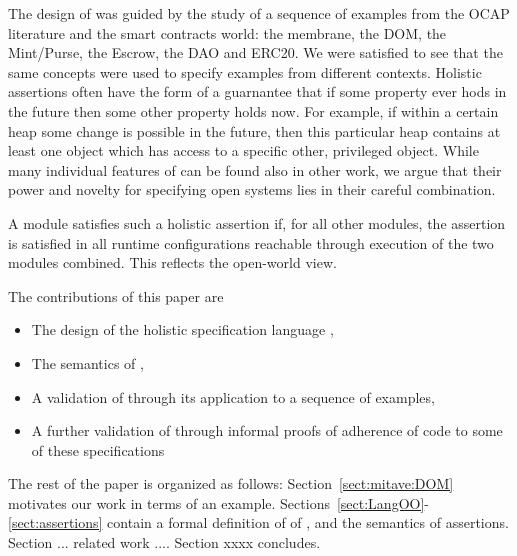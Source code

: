The design of \Chainmail was guided by the study of a sequence of examples from the OCAP literature and the 
smart contracts world: the membrane, the DOM, the Mint/Purse, the Escrow, the DAO and ERC20. 
We were satisfied to see that the same concepts were used to specify examples from  different contexts.
Holistic assertions often have the form of a guarnantee
 that if some property ever hods in the future then some other property holds now.
For example, if within a certain heap some change is possible in the future, then this particular heap contains 
at least one object which has access to a specific other, privileged object.
%
While many individual features of \Chainmail can be found also in other work, 
we argue that their power and novelty for specifying open systems lies in their careful combination.
 
A module satisfies such a holistic assertion if, for all other modules,
  the assertion is satisfied  in all runtime configurations reachable through execution of the two modules combined.
  This reflects the open-world view.
  
The contributions of this paper are
\begin{itemize}
\item The design of the holistic specification language \Chainmail,
\item The semantics of \Chainmail,
\item A validation of \Chainmail through its application to a sequence of examples,
\item A further validation of \Chainmail through informal proofs of adherence of code to some of these specifications
\end{itemize}  
  
  
The rest of the paper is organized as follows: Section~\ref{sect:mitave:DOM} 
motivates our work in terms of an example. Sections~\ref{sect:LangOO}-\ref{sect:assertions} contain a formal definition of of \LangOO, and the semantics of assertions. Section ... related work .... Section xxxx concludes.

  
   

 

